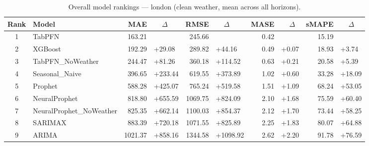 \begin{table}[ht!]
\centering
\caption{Overall model rankings — london (clean weather, mean across all horizons).}
\label{tab:overall_rankings_london}
{\small
\setlength{\tabcolsep}{3pt}
\scriptsize
\begin{tabular}{clrlrlrlrl}
\toprule
Rank & Model & MAE & ~~\(\Delta\) & RMSE & ~~\(\Delta\) & MASE & ~~\(\Delta\) & sMAPE & ~~\(\Delta\) \\
\midrule
1 & TabPFN & 163.21 &  & 245.66 &  & 0.42 &  & 15.19 &  \\
2 & XGBoost & 192.29 & +29.08 & 289.82 & +44.16 & 0.49 & +0.07 & 18.93 & +3.74 \\
3 & TabPFN_NoWeather & 244.47 & +81.26 & 360.18 & +114.52 & 0.63 & +0.21 & 20.58 & +5.39 \\
4 & Seasonal_Naive & 396.65 & +233.44 & 619.55 & +373.89 & 1.02 & +0.60 & 33.28 & +18.09 \\
5 & Prophet & 588.28 & +425.07 & 765.24 & +519.58 & 1.51 & +1.09 & 68.24 & +53.05 \\
6 & NeuralProphet & 818.80 & +655.59 & 1069.75 & +824.09 & 2.10 & +1.68 & 75.59 & +60.40 \\
7 & NeuralProphet_NoWeather & 825.35 & +662.14 & 1100.03 & +854.37 & 2.12 & +1.70 & 73.44 & +58.25 \\
8 & SARIMAX & 883.39 & +720.18 & 1071.55 & +825.89 & 2.25 & +1.83 & 80.07 & +64.88 \\
9 & ARIMA & 1021.37 & +858.16 & 1344.58 & +1098.92 & 2.62 & +2.20 & 91.78 & +76.59 \\
\bottomrule
\end{tabular}
}
\end{table}

